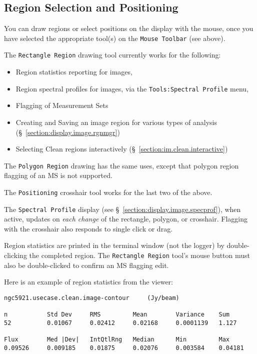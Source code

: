 
\subsection{Region Selection and Positioning}
\label{section:display.viewerGUI.displaypanel.region}

You can draw regions or select positions on the display with the mouse,
once you have selected the appropriate tool(s) on the {\tt Mouse Toolbar}
(see above).

The {\tt Rectangle Region} drawing tool currently works for the following: 
\begin{itemize}
  \item Region statistics reporting for images,
  \item Region spectral profiles for images, via the
        {\tt Tools:Spectral Profile} menu,
  \item Flagging of Measurement Sets
  \item Creating and Saving an image region for various types of analysis
        (\S~\ref{section:display.image.rgnmgr})
  \item Selecting Clean regions interactively (\S~\ref{section:im.clean.interactive})
\end{itemize}

The {\tt Polygon Region} drawing has the same uses, except that polygon region
flagging of an MS is not supported.

The {\tt Positioning} crosshair tool works for the last two of the above.

The {\tt Spectral Profile} display
(see \S~\ref{section:display.image.specprof}), when active, updates on
{\em each change} of the rectangle, polygon, or crosshair.  
Flagging with the crosshair also responds to single click or drag.

Region statistics are printed in the terminal window (not the logger)
by double-clicking the completed region.  The {\tt Rectangle Region}
tool's mouse button must also be double-clicked to confirm an MS
flagging edit.

Here is an example of region statistics from the viewer:
\small
\begin{verbatim}
ngc5921.usecase.clean.image-contour     (Jy/beam)

n           Std Dev     RMS         Mean        Variance    Sum
52          0.01067     0.02412     0.02168     0.0001139   1.127     

Flux        Med |Dev|   IntQtlRng   Median      Min         Max
0.09526     0.009185    0.01875     0.02076     0.003584    0.04181   
\end{verbatim}
\normalsize

